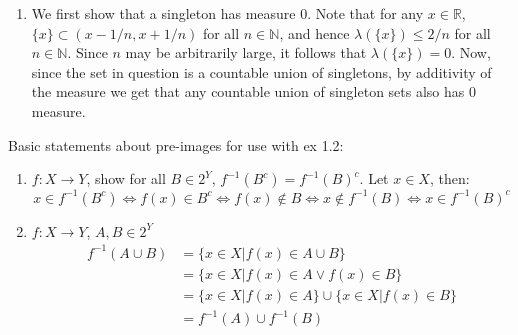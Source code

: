 \begin{gradedsolution}
\begin{enumerate}
        \item We first show that a singleton has measure $0$. Note that for any $x \in \mathbb{R}$, $\{x\} \subset (x - 1/n, x+1/n)$ for all $n \in \mathbb{N}$, and hence $\lambda(\{x\}) \leq 2/n$ for all $n \in \mathbb{N}$. Since $n$ may be arbitrarily large, it follows that $\lambda(\{x\}) = 0$. Now, since the set in question is a countable union of singletons, by additivity of the measure we get that any countable union of singleton sets also has $0$ measure.
    \end{enumerate}
    Basic statements about pre-images for use with ex 1.2:
    \begin{enumerate}
        \item $f: X \to Y$, show for all $B \in 2^Y$, $f^{-1}(B^c)=f^{-1}(B)^c$. Let $x \in X$, then:
        \[
            x \in f^{-1}(B^c) \Leftrightarrow f(x) \in B^c \Leftrightarrow f(x) \not \in B \Leftrightarrow x \not \in f^{-1}(B) \Leftrightarrow x \in f^{-1}(B)^c
        \]
        \item $f: X \to Y$, $A,B \in 2^Y$
        \begin{align*}
            f^{-1}(A \cup B)
            &= \{x \in X | f(x) \in A \cup B\}\\
            &= \{x \in X | f(x) \in A \vee f(x) \in B\}\\
            &= \{x \in X | f(x) \in A\} \cup \{x \in X | f(x) \in B\}\\
            &= f^{-1}(A) \cup f^{-1}(B)
        \end{align*}
    \end{enumerate}
\end{gradedsolution}

